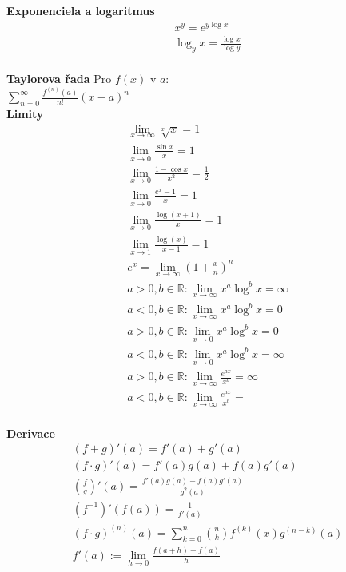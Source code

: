 \documentclass[8pt, a4paper]{extarticle}
\begin{document}
\begin{multicols}{3}
\textbf{Exponenciela a logaritmus}
\begin{align*}
x^y=e^{y\log x} \\
\log_yx=\frac{\log x}{\log y} \\
\end{align*}
 
\textbf{Taylorova řada}
Pro $f(x)$ v $a$:\\ $\sum\limits_{n=0}^\infty \frac{f^{(n)}(a)}{n!}(x-a)^n$\\
 
\textbf{Limity}
\begin{align*}
\lim\limits_{x\rightarrow\infty} \sqrt[x]{x} = 1 \\
\lim\limits_{x\rightarrow 0} \frac{\sin x}{x} = 1 \\
\lim\limits_{x\rightarrow 0} \frac{1 - \cos x}{x^2} = \frac{1}{2} \\
\lim\limits_{x\rightarrow 0} \frac{e^x -1}{x} = 1 \\
\lim\limits_{x\rightarrow 0} \frac{\log(x+1)}{x} = 1 \\
\lim\limits_{x\rightarrow 1} \frac{\log(x)}{x-1} = 1 \\
e^x=\lim_{x\to\infty}(1+\frac{x}{n})^n \\
a>0, b\in \mathbb{R}: \lim\limits_{x\rightarrow \infty} x^a\log^bx = \infty \\
a<0, b\in \mathbb{R}: \lim\limits_{x\rightarrow \infty} x^a\log^bx = 0 \\
a>0, b\in \mathbb{R}: \lim\limits_{x\rightarrow 0} x^a\log^bx = 0 \\
a<0, b\in \mathbb{R}: \lim\limits_{x\rightarrow 0} x^a\log^bx = \infty \\
a>0, b\in \mathbb{R}: \lim\limits_{x\rightarrow \infty} \frac{e^{ax}}{x^b} = \infty \\
a<0, b\in \mathbb{R}: \lim\limits_{x\rightarrow \infty} \frac{e^{ax}}{x^b} =  \\
\end{align*}
 
\textbf{Derivace}
\begin{align*}
(f+g)'(a)=f'(a)+g'(a)\\
(f\cdot g)'(a)=f'(a)g(a)+f(a)g'(a) \\
\left(\frac{f}{g}\right)'(a)=\frac{f'(a)g(a)-f(a)g'(a)}{g^2(a)} \\
(f^{-1})'(f(a))=\frac{1}{f'(a)} \\
(f\cdot g)^{(n)}(a)=\sum\limits_{k=0}^n \binom{n}{k}f^{(k)}(x)g^{(n-k)}(a) \\
f'(a):=\lim\limits_{h\to 0}\frac{f(a+h)-f(a)}{h} \\
\end{align*}
 

\end{multicols}
\end{document}
